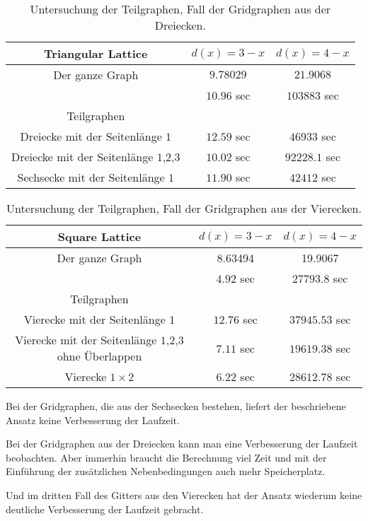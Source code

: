 \documentclass[
	fontsize=12pt,
	paper=a4,
	twoside=false,
	numbers=noenddot,
	plainheadsepline,
	toc=listof,
	toc=bibliography
]{scrartcl}
\begin{document}
\begin{itemize}
	\begin{table}[htbp]
	\centering
	\begin{tabular}{|c|c|c|}
		\hline Triangular Lattice& $d(x)=3-x$  & $d(x)=4-x$\\ \hline 
		Der ganze Graph&  $9.78029$	& $21.9068$ \\ 
			& $10.96$ sec	& $103883$ sec \\ \hline
		Teilgraphen & & \\\hline
		Dreiecke mit der Seitenlänge $1$& $12.59$ sec	& $46933$ sec \\ \hline
		Dreiecke mit der Seitenlänge $1$,$2$,$3$& $10.02$ sec	& $92228.1$ sec \\ \hline
		\rowcolor{red}  Sechsecke mit der Seitenlänge $1$ &  $11.90$ sec &  $42412$ sec  \\ \hline
	\end{tabular}
	\caption{Untersuchung der Teilgraphen, Fall der Gridgraphen aus der Dreiecken.}
	\label{Table:TG2}
	\end{table}
	
	
	\begin{table}[htbp]
	\centering
	\begin{tabular}{|c|c|c|}
	\hline Square Lattice& $d(x)=3-x$  & $d(x)=4-x$\\ \hline 
		Der ganze Graph	&  8.63494	& 19.9067 \\ 
			& $4.92$ sec	& $27793.8$ sec \\ \hline
		Teilgraphen & & \\ \hline
		Vierecke mit der Seitenlänge $1$& $12.76$ sec	& $37945.53$ sec \\ \hline
		Vierecke mit der Seitenlänge $1$,$2$,$3$ ohne Überlappen& $7.11$ sec	& $19619.38$ sec \\ \hline
		\rowcolor{red} Vierecke $1\times 2$ & $6.22$ sec& $28612.78$ sec  \\ \hline
	\end{tabular}
	\caption{Untersuchung der Teilgraphen, Fall der Gridgraphen aus der Vierecken.} 
	\label{Table:TG3}
	\end{table}
	
	Bei der Gridgraphen, die aus der Sechsecken bestehen, liefert der beschriebene Ansatz keine Verbesserung der Laufzeit.
	
	Bei der Gridgraphen aus der Dreiecken kann man eine Verbesserung der Laufzeit beobachten. Aber immerhin braucht die Berechnung viel Zeit und mit der Einführung der zusätzlichen Nebenbedingungen auch mehr Speicherplatz. 
	
	Und im dritten Fall des Gitters aus den Vierecken hat der Ansatz wiederum keine deutliche Verbesserung der Laufzeit gebracht.

\end{itemize}
\FloatBarrier 
\newpage
{}



\end{document}
